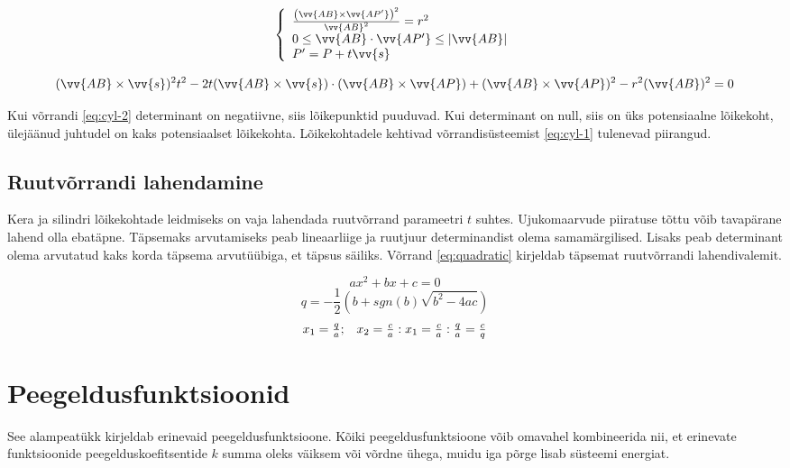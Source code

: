 \documentclass[a4paper,12pt]{report}
\renewcommand{\vec}[1]{\vv{#1}}
\begin{document}
\begin{equation} \label{eq:cyl-1}
\left\{
\begin{array}{l}
\frac{\left(\vec{AB}\times\vec{AP'}\right)^2}{\vec{AB}^2} = r^2 \\
0\leq\vec{AB}\cdot\vec{AP'}\leq|\vec{AB}| \\
P' = P + t\vec s
\end{array}
\right.
\end{equation}

\begin{equation} \label{eq:cyl-2}
(\vec{AB}\times\vec s)^2 t^2 -2t(\vec{AB}\times\vec s)\cdot(\vec{AB}\times\vec{AP}) + (\vec{AB}\times\vec{AP})^2 - r^2(\vec{AB})^2 = 0
\end{equation}

Kui võrrandi \ref{eq:cyl-2} determinant on negatiivne, siis lõikepunktid
puuduvad. Kui determinant on null, siis on üks potensiaalne lõikekoht,
ülejäänud juhtudel on kaks potensiaalset lõikekohta. Lõikekohtadele
kehtivad võrrandisüsteemist \ref{eq:cyl-1} tulenevad piirangud.

\subsection{Ruutvõrrandi lahendamine}
Kera ja silindri lõikekohtade leidmiseks on vaja lahendada ruutvõrrand
parameetri \(t\) suhtes. Ujukomaarvude piiratuse tõttu võib tavapärane
lahend olla ebatäpne. Täpsemaks arvutamiseks peab lineaarliige ja ruutjuur
determinandist olema samamärgilised. Lisaks peab determinant olema arvutatud
kaks korda täpsema arvutüübiga, et täpsus säiliks. \cite{FP-quadratic}
Võrrand \ref{eq:quadratic} kirjeldab täpsemat ruutvõrrandi lahendivalemit.

\[ax^2+bx+c=0\]
\[q = -\frac 1 2 \left(b + sgn(b)\sqrt{b^2-4ac}\right)\]
\begin{equation}
\begin{array}{l l} \label{eq:quadratic}
x_1 = \frac q a; & x_2 = \frac c a : x_1 = \frac c a : \frac q a = \frac c q
\end{array}
\end{equation}

\section{Peegeldusfunktsioonid}
See alampeatükk kirjeldab erinevaid peegeldusfunktsioone. Kõiki
peegeldusfunktsioone võib omavahel kombineerida nii, et erinevate funktsioonide
peegelduskoefitsentide \(k\) summa oleks väiksem või võrdne ühega, muidu
iga põrge lisab süsteemi energiat.
\end{document}
